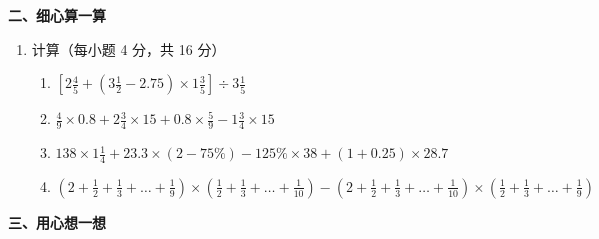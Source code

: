 \documentclass[11pt,a4paper]{ctexart}
\begin{document}
\vspace{0.8cm}

\noindent \textbf{二、细心算一算}

\begin{enumerate}
    \item[11.] 计算（每小题 4 分，共 16 分）
    \begin{enumerate}
        \item[(1)] $\left[ 2\frac{4}{5} + \left(3\frac{1}{2} - 2.75\right) \times 1\frac{3}{5} \right] \div 3\frac{1}{5}$
        \vspace{3.5cm}
        
        \item[(2)] $\frac{4}{9} \times 0.8 + 2\frac{3}{4} \times 15 + 0.8 \times \frac{5}{9} - 1\frac{3}{4} \times 15$
        \vspace{3.5cm}
        
        \item[(3)] $138 \times 1\frac{1}{4} + 23.3 \times (2 - 75\%) - 125\% \times 38 + (1 + 0.25) \times 28.7$
        \vspace{3.5cm}
        
        \item[(4)] $\left( 2 + \frac{1}{2} + \frac{1}{3} + \dots + \frac{1}{9} \right) \times \left( \frac{1}{2} + \frac{1}{3} + \dots + \frac{1}{10} \right) - \left( 2 + \frac{1}{2} + \frac{1}{3} + \dots + \frac{1}{10} \right) \times \left( \frac{1}{2} + \frac{1}{3} + \dots + \frac{1}{9} \right)$
        \vspace{3.5cm}
    \end{enumerate}
\end{enumerate}

\vspace{0.8cm}

\noindent \textbf{三、用心想一想}
\end{document}

